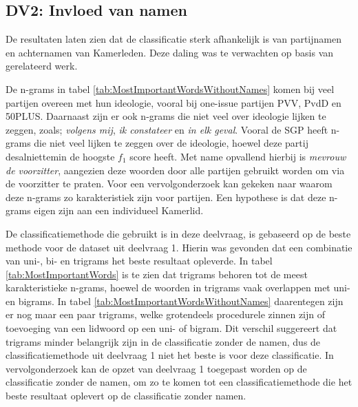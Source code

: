 \subsection{DV2: Invloed van namen}
De resultaten laten zien dat de classificatie sterk afhankelijk is van partijnamen en achternamen van Kamerleden. Deze daling was te verwachten op basis van gerelateerd werk.\par
De n-grams in tabel \ref{tab:MostImportantWordsWithoutNames} komen bij veel partijen overeen met hun ideologie, vooral bij one-issue partijen PVV, PvdD en 50PLUS. Daarnaast zijn er ook n-grams die niet veel over ideologie lijken te zeggen, zoals; \textit{volgens mij}, \textit{ik constateer} en \textit{in elk geval}. Vooral de SGP heeft n-grams die niet veel lijken te zeggen over de ideologie, hoewel deze partij desalniettemin de hoogste $f_1$ score heeft. Met name opvallend hierbij is \textit{mevrouw de voorzitter}, aangezien deze woorden door alle partijen gebruikt worden om via de voorzitter te praten. Voor een vervolgonderzoek kan gekeken naar waarom deze n-grams zo karakteristiek zijn voor partijen. Een hypothese is dat deze n-grams eigen zijn aan een individueel Kamerlid.\par
De classificatiemethode die gebruikt is in deze deelvraag, is gebaseerd op de beste methode voor de dataset uit deelvraag 1. Hierin was gevonden dat een combinatie van uni-, bi- en trigrams het beste resultaat opleverde. In tabel \ref{tab:MostImportantWords} is te zien dat trigrams behoren tot de meest karakteristieke n-grams, hoewel de woorden in trigrams vaak overlappen met uni- en bigrams. In tabel \ref{tab:MostImportantWordsWithoutNames} daarentegen zijn er nog maar een paar trigrams, welke grotendeels procedurele zinnen zijn of toevoeging van een lidwoord op een uni- of bigram. Dit verschil suggereert dat trigrams minder belangrijk zijn in de classificatie zonder de namen, dus de classificatiemethode uit deelvraag 1 niet het beste is voor deze classificatie. In vervolgonderzoek kan de opzet van deelvraag 1 toegepast worden op de classificatie zonder de namen, om zo te komen tot een classificatiemethode die het beste resultaat oplevert op de classificatie zonder namen.\par 

